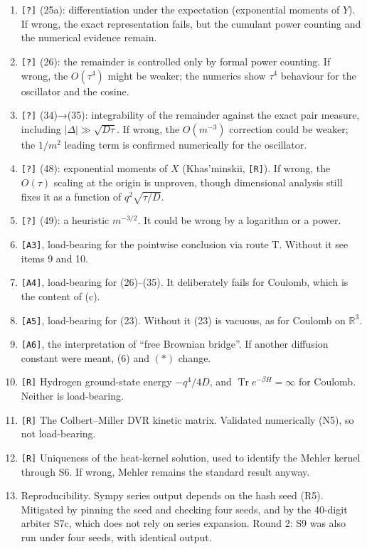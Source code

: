 \documentclass[11pt,a4paper]{article}
\begin{document}
\begin{enumerate}
\item
  \texttt{[?]} (25a): differentiation under the expectation (exponential moments of \(Y\)). If wrong, the exact representation fails, but the cumulant power counting and the numerical evidence remain.
\item
  \texttt{[?]} (26): the remainder is controlled only by formal power counting. If wrong, the \(O(\tau^4)\) might be weaker; the numerics show \(\tau^4\) behaviour for the oscillator and the cosine.
\item
  \texttt{[?]} (34)→(35): integrability of the remainder against the exact pair measure, including \(|\Delta|\gg\sqrt{D\tau}\). If wrong, the \(O(m^{-3})\) correction could be weaker; the \(1/m^2\) leading term is confirmed numerically for the oscillator.
\item
  \texttt{[?]} (48): exponential moments of \(X\) (Khas'minskii, \texttt{[R]}). If wrong, the \(O(\tau)\) scaling at the origin is unproven, though dimensional analysis still fixes it as a function of \(q^2\sqrt{\tau/D}\).
\item
  \texttt{[?]} (49): a heuristic \(m^{-3/2}\). It could be wrong by a logarithm or a power.
\item
  \texttt{[A3]}, load-bearing for the pointwise conclusion via route T. Without it see items 9 and 10.
\item
  \texttt{[A4]}, load-bearing for (26)--(35). It deliberately fails for Coulomb, which is the content of (c).
\item
  \texttt{[A5]}, load-bearing for (23). Without it (23) is vacuous, as for Coulomb on \(\mathbb R^3\).
\item
  \texttt{[A6]}, the interpretation of ``free Brownian bridge''. If another diffusion constant were meant, (6) and \((\ast)\) change.
\item
  \texttt{[R]} Hydrogen ground-state energy \(-q^4/4D\), and \(\operatorname{Tr}e^{-\beta H}=\infty\) for Coulomb. Neither is load-bearing.
\item
  \texttt{[R]} The Colbert--Miller DVR kinetic matrix. Validated numerically (N5), so not load-bearing.
\item
  \texttt{[R]} Uniqueness of the heat-kernel solution, used to identify the Mehler kernel through S6. If wrong, Mehler remains the standard result anyway.
\item
  Reproducibility. Sympy series output depends on the hash seed (R5). Mitigated by pinning the seed and checking four seeds, and by the 40-digit arbiter S7c, which does not rely on series expansion. Round 2: S9 was also run under four seeds, with identical output.

\end{enumerate}
\end{document}
